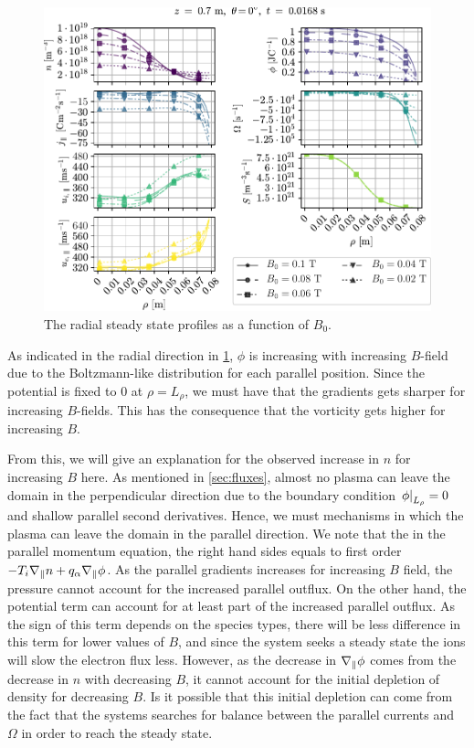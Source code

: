 %
\begin{figure}[htb]
    \centering
    \includegraphics{fig/results/bScan/BScanRad}
    \caption{The radial steady state profiles as a function of $B_0$.}
    \label{fig:linBScanRad}
\end{figure}
%
As indicated in the radial direction in \cref{fig:linBScanRad}, $\phi$ is increasing with increasing $B$-field due to the Boltzmann-like distribution for each parallel position.
Since the potential is fixed to $0$ at $\rho = L_\rho$, we must have that the gradients gets sharper for increasing $B$-fields.
This has the consequence that the vorticity gets higher for increasing $B$.

From this, we will give an explanation for the observed increase in $n$ for increasing $B$ here.
As mentioned in \cref{sec:fluxes}, almost no plasma can leave the domain in the perpendicular direction due to the boundary condition $\left.\phi\right|_{L_\rho}=0$ and shallow parallel second derivatives.
Hence, we must mechanisms in which the plasma can leave the domain in the parallel direction.
We note that the in the parallel momentum equation, the right hand sides equals to first order $-T_i \nabla_\| n + q_\alpha \nabla_\| \phi$.
As the parallel gradients increases for increasing $B$ field, the pressure cannot account for the increased parallel outflux.
On the other hand, the potential term can account for at least part of the increased parallel outflux.
As the sign of this term depends on the species types, there will be less difference in this term for lower values of $B$, and since the system seeks a steady state the ions will slow the electron flux less.
However, as the decrease in $\nabla_\| \phi$ comes from the decrease in $n$ with decreasing $B$, it cannot account for the initial depletion of density for decreasing $B$.
Is it possible that this initial depletion can come from the fact that the systems searches for balance between the parallel currents and $\Omega$ in order to reach the steady state.

